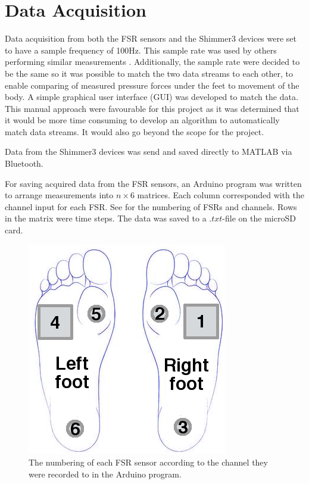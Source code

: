 \section{Data Acquisition}

Data acquisition from both the FSR sensors and the Shimmer3 devices were set to have a sample frequency of 100Hz. This sample rate was used by others performing similar measurements \cite{Verkerke2005, Byun2016, Sherwani2016}. Additionally, the sample rate were decided to be the same so it was possible to match the two data streams to each other, to enable comparing of measured pressure forces under the feet to movement of the body. A simple graphical user interface (GUI) was developed to match the data. This manual approach were favourable for this project as it was determined that it would be more time consuming to develop an algorithm to automatically match data streams. It would also go beyond the scope for the project.

Data from the Shimmer3 devices was send and saved directly to MATLAB via Bluetooth.%

For saving acquired data from the FSR sensors, an Arduino program was written to arrange measurements into $n\times6$ matrices. Each column corresponded with the channel input for each FSR. See  for the numbering of FSRs and channels. Rows in the matrix were time steps. The data was saved to a $.txt$-file on the microSD card. 

\begin{figure}[H]
	\includegraphics[width=.3\textwidth]{figures/FSRNumbering}
	\caption{The numbering of each FSR sensor according to the channel they were recorded to in the Arduino program.}
	\label{fig:FSRNumbering}  %
\end{figure}



